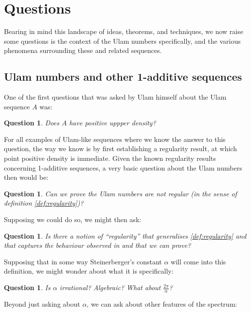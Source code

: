 \documentclass{article}
\newtheorem{question}[theorem]{Question}
\theoremstyle{definition}
\theoremstyle{remark}
\numberwithin{equation}{section}
\begin{document}
\section{Questions}

Bearing in mind this landscape of ideas, theorems, and techniques, we
now raise some questions is the context of the Ulam numbers
specifically, and the various phenomena surrounding these and related
sequences.  

\subsection{Ulam numbers and other 1-additive sequences}

One of the first questions that was asked by Ulam himself about the
Ulam sequence $A$ was: 

\begin{question}\label{qn:density}
  Does $A$ have positive uppper density?
\end{question}

For all examples of Ulam-like sequences where we know the answer to
this question, the way we know is by first establishing a regularity
result, at which point positive density is immediate.  Given the known
regularity results concerning 1-additive sequences, a very basic
question about the Ulam numbers then would be:

\begin{question}\label{qn:irregular}
  Can we prove the Ulam numbers are not regular (in the sense of
  definition \ref{def:regularity})?
\end{question}

Supposing we could do so, we might then ask:

\begin{question}\label{qn:regularity_def}
  Is there a notion of ``regularity'' that generalises
  \ref{def:regularity} and that captures the behaviour observed in
  \cite{ulam_steinerberger} and that we can prove?
\end{question}

Supposing that in some way Steinerberger's constant $\alpha$ will come
into this definition, we might wonder about what it is specifically:

\begin{question}\label{qn:rationality}
  Is $\alpha$ irrational?  Algebraic?  What about
  $\frac{2\pi}{\alpha}$?
\end{question}

Beyond just asking about $\alpha$, we can ask about other features of
the spectrum: 
\end{document}
